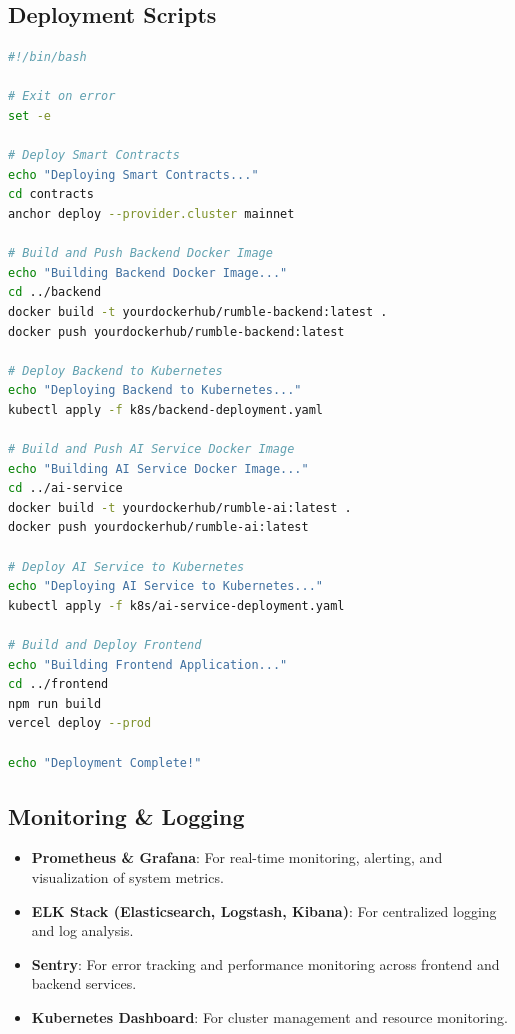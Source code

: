 \documentclass[11pt,a4paper]{article}
\begin{document}
\subsection{Deployment Scripts}

\begin{lstlisting}[language=bash, caption={Deployment Script}]
#!/bin/bash

# Exit on error
set -e

# Deploy Smart Contracts
echo "Deploying Smart Contracts..."
cd contracts
anchor deploy --provider.cluster mainnet

# Build and Push Backend Docker Image
echo "Building Backend Docker Image..."
cd ../backend
docker build -t yourdockerhub/rumble-backend:latest .
docker push yourdockerhub/rumble-backend:latest

# Deploy Backend to Kubernetes
echo "Deploying Backend to Kubernetes..."
kubectl apply -f k8s/backend-deployment.yaml

# Build and Push AI Service Docker Image
echo "Building AI Service Docker Image..."
cd ../ai-service
docker build -t yourdockerhub/rumble-ai:latest .
docker push yourdockerhub/rumble-ai:latest

# Deploy AI Service to Kubernetes
echo "Deploying AI Service to Kubernetes..."
kubectl apply -f k8s/ai-service-deployment.yaml

# Build and Deploy Frontend
echo "Building Frontend Application..."
cd ../frontend
npm run build
vercel deploy --prod

echo "Deployment Complete!"
\end{lstlisting}

\subsection{Monitoring \& Logging}

\begin{itemize}
    \item \textbf{Prometheus \& Grafana}: For real-time monitoring, alerting, and visualization of system metrics.
    \item \textbf{ELK Stack (Elasticsearch, Logstash, Kibana)}: For centralized logging and log analysis.
    \item \textbf{Sentry}: For error tracking and performance monitoring across frontend and backend services.
    \item \textbf{Kubernetes Dashboard}: For cluster management and resource monitoring.
\end{itemize}
\end{document}
